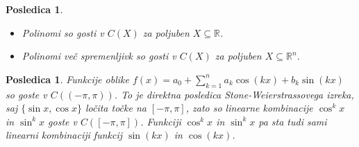 \documentclass[10pt, a4paper]{article}
\newtheorem{posledica}[izr]{Posledica}
\newcommand{\R}{\mathbb {R}}
\begin{document}
\begin{posledica}
  \begin{itemize}
    \item Polinomi so gosti v $C(X)$ za poljuben $X \subseteq \R$.
    \item Polinomi več spremenljivk so gosti v $C(X)$ za poljuben $X \subseteq \R^n$.
  \end{itemize}
\end{posledica}

\begin{posledica}
  Funkcije oblike $f(x) = a_0 + \sum_{k = 1} ^n a_k \cos (kx) + b_k \sin (kx)$ so goste v $C((-\pi, \pi))$.
  To je direktna posledica Stone-Weierstrassovega izreka, saj $\{\sin x, \cos x\}$ ločita točke na 
  $[-\pi, \pi]$, zato so linearne kombinacije $\cos^{k} x$ in $\sin^k x$ goste v $C([-\pi, \pi])$.
  Funkciji $\cos^k x$ in $\sin^k x$ pa sta tudi sami linearni kombinaciji funkcij $\sin(kx)$ in $\cos (kx)$.
\end{posledica}
\end{document}
